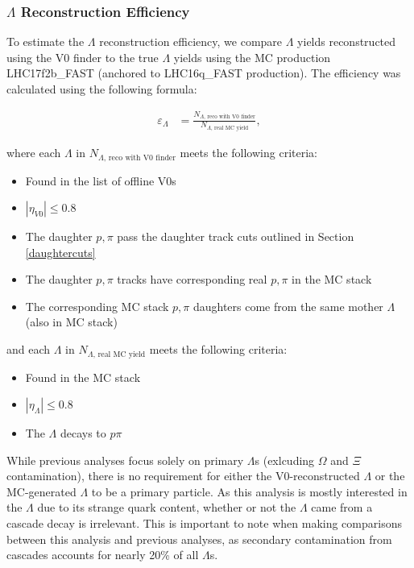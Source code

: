 \documentclass[ALICE,manyauthors]{ALICE_analysis_notes}
\begin{document}
\begin{itemize}
\subsubsection{$\Lambda$ Reconstruction Efficiency}
\label{lambda_efficiency}

To estimate the $\Lambda$ reconstruction efficiency, we compare $\Lambda$ yields reconstructed using the V0 finder to the true $\Lambda$ yields using the MC production LHC17f2b\_FAST (anchored to LHC16q\_FAST production). The efficiency was calculated using the following formula:

\begin{align*}
	\varepsilon_{\Lambda} &=  \frac{N_{\Lambda\text{, reco with V0 finder}}}{N_{\Lambda\text{, real MC yield}}},
\end{align*}

where each $\Lambda$ in $N_{\Lambda\text{, reco with V0 finder}}$ meets the following criteria:

\begin{itemize}
	\item Found in the list of offline V0s
	\item $|\eta_{V0}| \leq 0.8$
	\item The daughter $p, \pi$ pass the daughter track cuts outlined in Section \ref{daughtercuts}
	\item The daughter $p, \pi$ tracks have corresponding real $p, \pi$ in the MC stack
	\item The corresponding MC stack $p, \pi$ daughters come from the same mother $\Lambda$ (also in MC stack)
\end{itemize}

and each $\Lambda$ in $N_{\Lambda\text{, real MC yield}}$ meets the following criteria:

\begin{itemize}
	\item Found in the MC stack
	\item $|\eta_{\Lambda}| \leq 0.8$
	\item The $\Lambda$ decays to $p\pi$
\end{itemize}

While previous analyses focus solely on primary $\Lambda$s (exlcuding $\Omega$ and $\Xi$ contamination), there is no requirement for either the V0-reconstructed $\Lambda$ or the MC-generated $\Lambda$ to be a primary particle. As this analysis is mostly interested in the $\Lambda$ due to its strange quark content, whether or not the $\Lambda$ came from a cascade decay is irrelevant. This is important to note when making comparisons between this analysis and previous analyses, as secondary contamination from cascades accounts for nearly 20\% of all $\Lambda$s.


\end{itemize}
\end{document}
